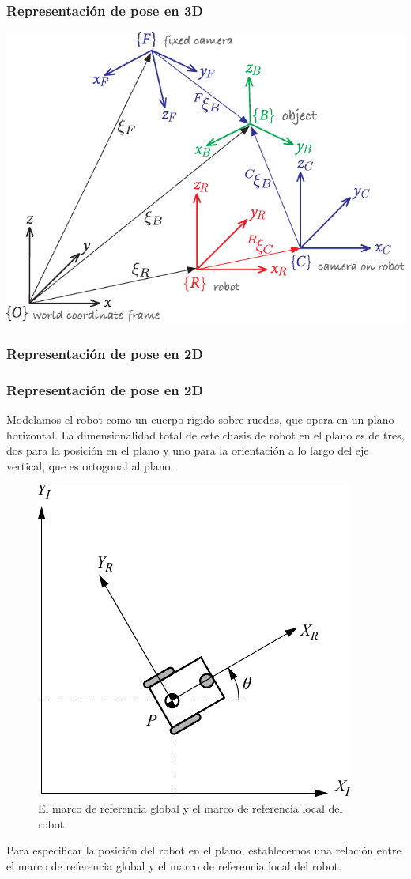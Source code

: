 \begin{frame}
    \frametitle{Representación de pose en 3D}

    \includegraphics[width=\columnwidth]{./images/multiple_coordinate_frames_3d.pdf}

\end{frame}

\begin{frame}
    \frametitle{Representación de pose en 2D}

\end{frame}


\begin{frame}
    \frametitle{Representación de pose en 2D}
    \footnotesize
    Modelamos el robot como un cuerpo rígido sobre ruedas, que opera en un plano horizontal. La dimensionalidad total de este chasis de robot en el plano es de tres, dos para la posición en el plano y uno para la orientación a lo largo del eje vertical, que es ortogonal al plano.

    \begin{figure}[!h]
        \includegraphics[width=0.4\columnwidth]{./images/coordinate_systems.pdf}
        \caption{El marco de referencia global y el marco de referencia local del robot.}
    \end{figure}

    Para especificar la posición del robot en el plano, establecemos una relación entre el marco de referencia global y el marco de referencia local del robot.

\end{frame}


